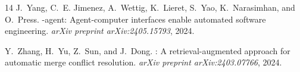 \documentclass[11pt,a4paper]{article}
\begin{document}
\begin{thebibliography}{14}
J.~Yang, C.~E. Jimenez, A.~Wettig, K.~Lieret, S.~Yao, K.~Narasimhan, and O.~Press.
-agent: Agent-computer interfaces enable automated software engineering.
\newblock \emph{arXiv preprint arXiv:2405.15793}, 2024.

Y.~Zhang, H.~Yu, Z.~Sun, and J.~Dong.
: A retrieval-augmented approach for automatic merge conflict resolution.
\newblock \emph{arXiv preprint arXiv:2403.07766}, 2024.

\end{thebibliography}
\end{document}
